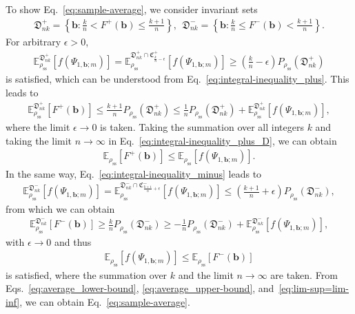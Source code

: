\documentclass[preprint,pteplogo]{ptephy_v2}%
\numberwithin{equation}{section}
\theoremstyle{definition}
\begin{document}
To show Eq.~\eqref{eq:sample-average}, we consider invariant sets
\begin{align}
\mathfrak{D}_{nk}^+=\left\{\bm{b} : \frac{k}{n} < F^+(\bm{b}) \leq \frac{k+1}{n} \right\},\ \ \mathfrak{D}_{nk}^-=\left\{\bm{b} : \frac{k}{n} \leq F^-(\bm{b}) < \frac{k+1}{n} \right\}.
\end{align}
For arbitrary $\epsilon>0$, 
\begin{align}
\mathbb{E}_{\rho_\mathrm{ss}}^{\mathfrak{D}_{nk}^+}\left[f(\Psi_{1,\bm{b};m})\right]
=\mathbb{E}_{\rho_\mathrm{ss}}^{\mathfrak{D}_{nk}^+ \cap \mathfrak{C}_{\frac{k}{n}-\epsilon}^+}\left[f(\Psi_{1,\bm{b};m})\right]
\geq\left(\frac{k}{n}-\epsilon\right)P_{\rho_\mathrm{ss}}(\mathfrak{D}_{nk}^+)
\end{align}
is satisfied, which can be understood from Eq.~\eqref{eq:integral-inequality_plus}. 
This leads to
\begin{align}
\mathbb{E}_{\rho_\mathrm{ss}}^{\mathfrak{D}_{nk}^+}\left[F^+(\bm{b})\right]\leq\frac{k+1}{n}P_{\rho_\mathrm{ss}}(\mathfrak{D}_{nk}^+)
\leq\frac{1}{n}P_{\rho_\mathrm{ss}}(\mathfrak{D}_{nk}^+)+\mathbb{E}_{\rho_\mathrm{ss}}^{\mathfrak{D}_{nk}^+}\left[f(\Psi_{1,\bm{b};m})\right],
\label{eq:integral-inequality_plus_D}
\end{align}
where the limit $\epsilon\rightarrow0$ is taken. 
Taking the summation over all integers $k$ and taking the limit $n\rightarrow\infty$ in Eq.~\eqref{eq:integral-inequality_plus_D}, we can obtain
\begin{align}
\mathbb{E}_{\rho_\mathrm{ss}}\left[F^+(\bm{b})\right]\leq\mathbb{E}_{\rho_\mathrm{ss}}\left[f(\Psi_{1,\bm{b};m})\right].
\label{eq:average_lower-bound}
\end{align}
In the same way, Eq.~\eqref{eq:integral-inequality_minus} leads to
\begin{align}
\mathbb{E}_{\rho_\mathrm{ss}}^{\mathfrak{D}_{nk}^-}\left[f(\Psi_{1,\bm{b};m})\right]=\mathbb{E}_{\rho_\mathrm{ss}}^{\mathfrak{D}_{nk}^- \cap \mathfrak{C}_{\frac{k+1}{n}+\epsilon}^-}\left[f(\Psi_{1,\bm{b};m})\right]
\leq\left(\frac{k+1}{n}+\epsilon\right)P_{\rho_\mathrm{ss}}(\mathfrak{D}_{nk}^-),
\end{align}
from which we can obtain
\begin{align}
\mathbb{E}_{\rho_\mathrm{ss}}^{\mathfrak{D}_{nk}^-}\left[F^-(\bm{b})\right]\geq\frac{k}{n}P_{\rho_\mathrm{ss}}(\mathfrak{D}_{nk}^-)
\geq-\frac{1}{n}P_{\rho_\mathrm{ss}}(\mathfrak{D}_{nk}^-)+\mathbb{E}_{\rho_\mathrm{ss}}^{\mathfrak{D}_{nk}^-}\left[f(\Psi_{1,\bm{b};m})\right],
\label{eq:integral-inequality_minus_D}
\end{align}
with $\epsilon\rightarrow0$ and thus
\begin{align}
\mathbb{E}_{\rho_\mathrm{ss}}\left[f(\Psi_{1,\bm{b};m})\right]\leq\mathbb{E}_{\rho_\mathrm{ss}}\left[F^-(\bm{b})\right]
\label{eq:average_upper-bound}
\end{align}
is satisfied, where the summation over $k$ and the limit $n\rightarrow\infty$ are taken. 
From Eqs.~\eqref{eq:average_lower-bound}, \eqref{eq:average_upper-bound}, and~\eqref{eq:lim-sup=lim-inf}, we can obtain Eq.~\eqref{eq:sample-average}.
\end{document}
